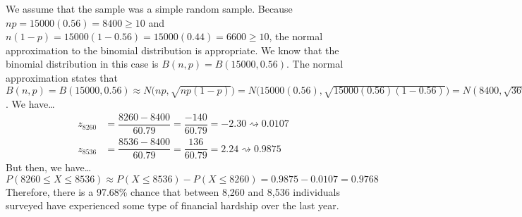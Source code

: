 \documentclass[11pt,letterpaper]{article}
\newcommand{\squiggle}{\rightsquigarrow}
\begin{document}
\sol We assume that the sample was a simple random sample. Because $np= 15000(0.56)= 8400 \geq 10$ and $n(1 - p)= 15000(1 - 0.56)= 15000(0.44)= 6600 \geq 10$, the normal approximation to the binomial distribution is appropriate. We know that the binomial distribution in this case is $B(n, p)= B(15000, 0.56)$. The normal approximation states that $B(n, p)= B(15000, 0.56) \approx N \big(np, \sqrt{np(1 - p)} \big)= N \big(15000(0.56), \sqrt{15000(0.56)(1- 0.56)} \big)= N(8400, \sqrt{3696})= N(8400, 60.79)$. We have\dots
	\[
	\begin{aligned}
	z_{8260}&= \dfrac{8260 - 8400}{60.79}= \dfrac{-140}{60.79}= -2.30 \squiggle 0.0107 \\[0.3cm]
	z_{8536}&= \dfrac{8536 - 8400}{60.79}= \dfrac{136}{60.79}= 2.24 \squiggle 0.9875
	\end{aligned}
	\]
But then, we have\dots
	\[
	P(8260 \leq X \leq 8536) \approx P(X \leq 8536) - P(X \leq 8260)= 0.9875 - 0.0107= 0.9768
	\]
Therefore, there is a 97.68\% chance that between 8,260 and 8,536 individuals surveyed have experienced some type of financial hardship over the last year. 
\end{document}
